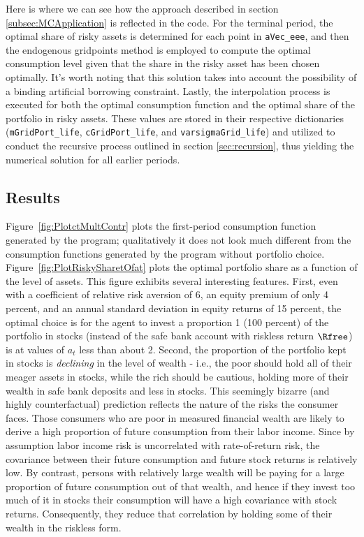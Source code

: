 \documentclass[titlepage, headings=optiontotocandhead]{\econtex}
\begin{document}
Here is where we can see how the approach described in section \ref{subsec:MCApplication} is reflected in the code.  For the terminal period, the optimal share of risky assets is determined for each point in \texttt{aVec\_eee}, and then the endogenous gridpoints method is employed to compute the optimal consumption level given that the share in the risky asset has been chosen optimally. It's worth noting that this solution takes into account the possibility of a binding artificial borrowing constraint. Lastly, the interpolation process is executed for both the optimal consumption function and the optimal share of the portfolio in risky assets. These values are stored in their respective dictionaries (\texttt{mGridPort\_life}, \texttt{cGridPort\_life}, and \texttt{varsigmaGrid\_life}) and utilized to conduct the recursive process outlined in section \ref{sec:recursion}, thus yielding the numerical solution for all earlier periods.

\subsection{Results}

Figure~\ref{fig:PlotctMultContr} plots the first-period consumption
function generated by the program; qualitatively it does not look much
different from the consumption functions generated by the program
without portfolio choice.  Figure~\ref{fig:PlotRiskySharetOfat} plots the
optimal portfolio share as a function of the level of assets.  This
figure exhibits several interesting features.  First, even with a
coefficient of relative risk aversion of 6, an equity premium of only
4 percent, and an annual standard deviation in equity returns of 15
percent, the optimal choice is for the agent
to invest a proportion 1 (100 percent) of the portfolio in stocks (instead of the safe bank account with riskless return $\Rfree$) is
at values of ${a}_{t}$ less than about 2.  Second, the
proportion of the portfolio kept in stocks is \textit{declining} in the
level of wealth - i.e., the poor should hold all of their meager
assets in stocks, while the rich should be cautious, holding more of
their wealth in safe bank deposits and less in stocks.  This
seemingly bizarre (and highly counterfactual) prediction reflects the
nature of the risks the consumer faces.  Those consumers who are poor
in measured financial wealth are likely to derive a high proportion of
future consumption from their labor income.  Since by assumption labor
income risk is uncorrelated with rate-of-return risk, the covariance
between their future consumption and future stock returns is
relatively low.  By contrast, persons with relatively large wealth
will be paying for a large proportion of future consumption out of that
wealth, and hence if they invest too much of it in stocks their consumption
will have a high covariance with stock returns.  Consequently, they
reduce that correlation by holding some of their wealth in the
riskless form.
\end{document}
